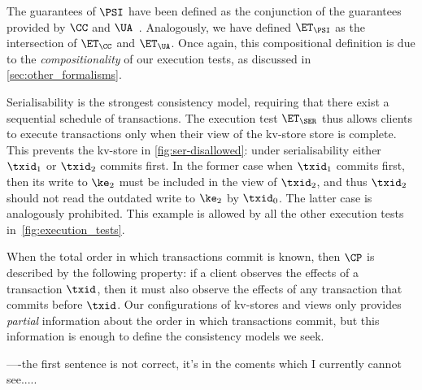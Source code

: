 The guarantees of $\PSI$ have been defined as the conjunction of the guarantees provided by $\CC$ and $\UA$~\cite{framework-concur}.
Analogously, we have defined $\ET_\PSI$ as the intersection of $\ET_\CC$ and $\ET_\UA$. 
Once again, this compositional definition is due to the \emph{compositionality} of our execution tests, as discussed in \cref{sec:other_formalisms}.


Serialisability is the strongest consistency model, requiring that there exist a sequential schedule of transactions. 
The execution test $\ET_{\SER}$ thus allows clients to execute transactions only when 
their view of the kv-store store is complete.
This prevents the kv-store in  \cref{fig:ser-disallowed}: under serialisability either $\txid_1$ or $\txid_2$ commits first.
In the former case when $\txid_1$ commits first, then its write to $\ke_2$ must be included in the view of $\txid_2$, and thus $\txid_2$ should not read the outdated write to $\ke_2$ by $\txid_0$. 
The latter case is analogously prohibited. 
This example is allowed by all the other execution tests in~\cref{fig:execution_tests}.





\label{para:cp}

When the total order in which transactions commit is known, then 
$\CP$ is described by the following property: 
if a client observes the effects of a transaction $\txid$,
then it must also observe the effects of any transaction that commits before
$\txid$. 
Our configurations of kv-stores and views only provides {\em
  partial} information about the order in which transactions commit,
but this information is enough to define the consistency models we
seek. 

----the first sentence is not correct, it's in the coments which I
currently cannot see.....

